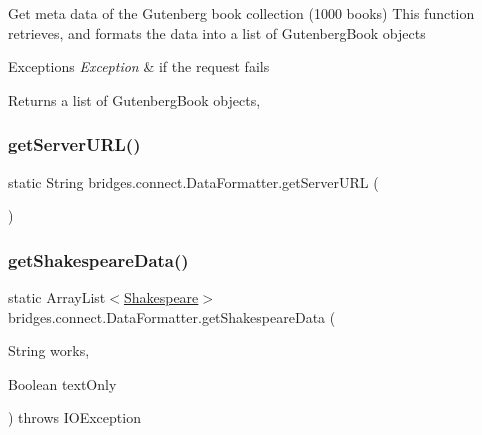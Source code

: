 Get meta data of the Gutenberg book collection (1000 books) This function retrieves, and formats the data into a list of Gutenberg\+Book objects


\begin{DoxyExceptions}{Exceptions}
{\em Exception} & if the request fails\\
\hline
\end{DoxyExceptions}
\begin{DoxyReturn}{Returns}
a list of Gutenberg\+Book objects, 
\end{DoxyReturn}
\mbox{\label{classbridges_1_1connect_1_1_data_formatter_a4abc8f8b0970d6c07c680ac485e299c7}} 
\subsubsection{\texorpdfstring{getServerURL()}{getServerURL()}}
{\footnotesize\ttfamily static String bridges.\+connect.\+Data\+Formatter.\+get\+Server\+U\+RL (\begin{DoxyParamCaption}{ }\end{DoxyParamCaption})\hspace{0.3cm}{\ttfamily [static]}}

\mbox{\label{classbridges_1_1connect_1_1_data_formatter_ac090a4d67b38b9649bf811906f9a630a}} 
\subsubsection{\texorpdfstring{getShakespeareData()}{getShakespeareData()}}
{\footnotesize\ttfamily static Array\+List$<$\mbox{\hyperlink{classbridges_1_1data__src__dependent_1_1_shakespeare}{Shakespeare}}$>$ bridges.\+connect.\+Data\+Formatter.\+get\+Shakespeare\+Data (\begin{DoxyParamCaption}\item[{String}]{works,  }\item[{Boolean}]{text\+Only }\end{DoxyParamCaption}) throws I\+O\+Exception\hspace{0.3cm}{\ttfamily [static]}}

